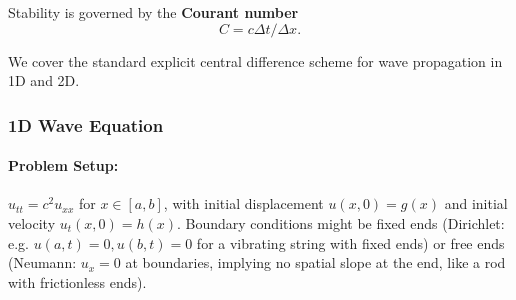 \documentclass[a4paper,11pt]{article}
\begin{document}
Stability is governed by the \textbf{Courant number}
$$C = c\Delta t/\Delta x.$$

We cover the standard explicit central difference scheme for wave propagation in 1D and 2D.

\subsubsection{1D Wave Equation}
\paragraph{Problem Setup:}
$u_{tt} = c^2 u_{xx}$ for $x\in[a,b]$, with initial displacement $u(x,0)=g(x)$ and initial velocity $u_t(x,0)=h(x)$. Boundary conditions might be fixed ends (Dirichlet: e.g. $u(a,t)=0, u(b,t)=0$ for a vibrating string with fixed ends) or free ends (Neumann: $u_x=0$ at boundaries, implying no spatial slope at the end, like a rod with frictionless ends).
\end{document}
